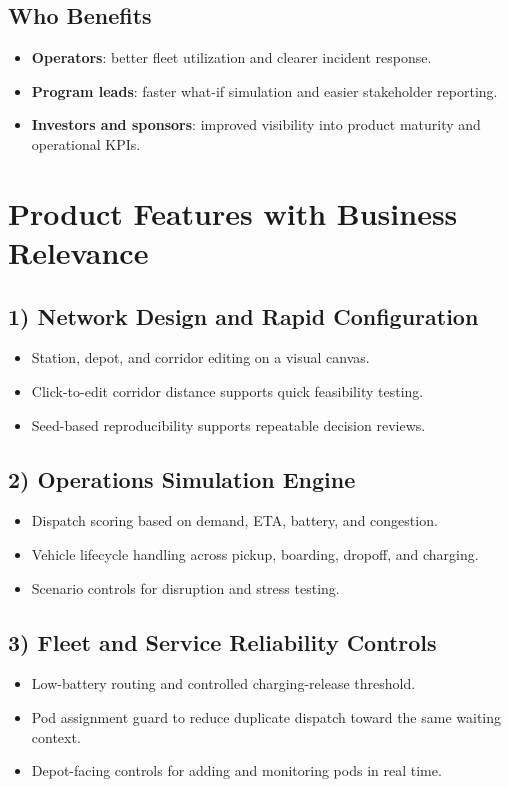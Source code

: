 \documentclass[11pt,a4paper]{article}
\begin{document}
\subsection*{Who Benefits}
\begin{itemize}
  \item \textbf{Operators}: better fleet utilization and clearer incident response.
  \item \textbf{Program leads}: faster what-if simulation and easier stakeholder reporting.
  \item \textbf{Investors and sponsors}: improved visibility into product maturity and operational KPIs.
\end{itemize}

\section{Product Features with Business Relevance}
\subsection*{1) Network Design and Rapid Configuration}
\begin{itemize}
  \item Station, depot, and corridor editing on a visual canvas.
  \item Click-to-edit corridor distance supports quick feasibility testing.
  \item Seed-based reproducibility supports repeatable decision reviews.
\end{itemize}

\subsection*{2) Operations Simulation Engine}
\begin{itemize}
  \item Dispatch scoring based on demand, ETA, battery, and congestion.
  \item Vehicle lifecycle handling across pickup, boarding, dropoff, and charging.
  \item Scenario controls for disruption and stress testing.
\end{itemize}

\subsection*{3) Fleet and Service Reliability Controls}
\begin{itemize}
  \item Low-battery routing and controlled charging-release threshold.
  \item Pod assignment guard to reduce duplicate dispatch toward the same waiting context.
  \item Depot-facing controls for adding and monitoring pods in real time.
\end{itemize}
\end{document}

